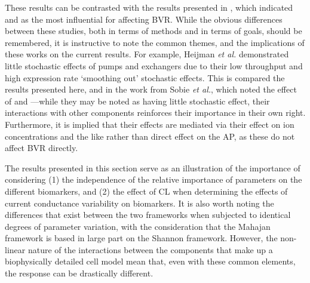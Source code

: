 \documentclass[../thesis-main.tex]{subfiles}
\begin{document}
These results can be contrasted with the results presented in \citet{Heijman2013}, which indicated \ina{} and \ikr{} as the most influential for affecting BVR. While the obvious differences between these studies, both in terms of methods and in terms of goals, should be remembered, it is instructive to note the common themes, and the implications of these works on the current results. For example, Heijman \emph{et al.} demonstrated little stochastic effects of pumps and exchangers due to their low throughput and high expression rate `smoothing out' stochastic effects. This is compared the results presented here, and in the work from Sobie \emph{et al.}, which noted the effect of \inak{} and \inaca{}---while they may be noted as having little stochastic effect, their interactions with other components reinforces their importance in their own right. Furthermore, it is implied that their effects are mediated via their effect on ion concentrations and the like rather than direct effect on the AP, as these do not affect BVR directly.

The results presented in this section serve as an illustration of the importance of considering (1) the independence of the relative importance of parameters on the different biomarkers, and (2) the effect of CL when determining the effects of current conductance variability on biomarkers. It is also worth noting the differences that exist between the two frameworks when subjected to identical degrees of parameter variation, with the consideration that the Mahajan framework is based in large part on the Shannon framework. However, the non-linear nature of the interactions between the components that make up a biophysically detailed cell model mean that, even with these common elements, the response can be drastically different.

\end{document}
